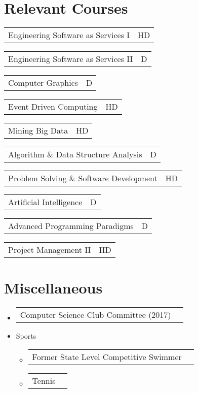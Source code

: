 \documentclass[letterpaper,11pt]{article}
\makeatletter
\newcommand{\headerrow}[2]{
	\begin{tabular*}{\linewidth}{l@{\extracolsep{\fill}}r}
		#1 & #2 \\
\end{tabular*}}
\makeatother
\begin{document}
\begin{minipage}[t]{0.50\columnwidth}
	\section{Relevant Courses}

	\headerrow{Engineering Software as Services I}{HD}
	\headerrow{Engineering Software as Services II}{D}
	\headerrow{Computer Graphics}{D}
	\headerrow{Event Driven Computing}{HD}
	\headerrow{Mining Big Data}{HD}
	\headerrow{Algorithm \& Data Structure Analysis}{D}
	\headerrow{Problem Solving \& Software Development}{HD}
	\headerrow{Artificial Intelligence}{D}
	\headerrow{Advanced Programming Paradigms}{D}
	\headerrow{Project Management II}{HD}

\end{minipage}%
\hfill
\begin{minipage}[t]{0.47\columnwidth}
	\section{Miscellaneous}

	\begin{itemize}
		\item \headerrow{Computer Science Club Committee (2017)}{}
		\item Sports

		\begin{itemize}

			\item \headerrow{Former State Level Competitive Swimmer}{}
			\item \headerrow{Tennis}{}

		\end{itemize}

	\end{itemize}

\end{minipage}
\end{document}
